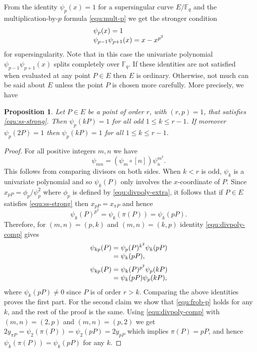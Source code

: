 \documentclass[12pt]{article}
\theoremstyle{plain}
\newtheorem{proposition}[theorem]{Proposition}
\theoremstyle{definition}
\def\F{\ensuremath{\mathbb{F}}}
\begin{document}
From the identity $\psi_p(x) = 1$ for a supersingular curve $E/\F_q$ and the multiplication-by-$p$ 
formula \eqref{equ:mult-p} we get the stronger condition
\begin{equation}
\label{equ:ss-strong}
	\arraycolsep=1.4pt
	\begin{array}{l}
		\psi_p(x) = 1 \\
		\psi_{p - 1}\psi_{p + 1}(x) = x - x^{p^2}
	\end{array}
\end{equation}
for supersingularity. Note that in this case the univariate polynomial $\psi_{p - 1}\psi_{p + 
1}(x)$ splits completely over $\F_q$. If these identities are not satisfied when evaluated at any 
point $P \in E$ then $E$ is ordinary. Otherwise, not much can be said about $E$ unless the point 
$P$ is chosen more carefully. More precisely, we have
\begin{proposition}
	Let $P \in E$ be a point of order $r$, with $(r, p) = 1$, that satisfies \eqref{equ:ss-strong}. 
	Then $\psi_p(kP) = 1$ for all odd $1 \le k \le r - 1$. If moreover $\psi_p(2P) = 1$ then 
	$\psi_p(kP) = 1$ for all $1 \le k \le r - 1$.
\end{proposition}
\begin{proof}
	For all positive integers $m, n$ we have
	\begin{equation}
	\label{equ:divpoly-comp}
		\psi_{mn} = (\psi_m \circ [n])\psi_n^{m^2}.
	\end{equation}
	This follows from comparing divisors on both sides. When $k < r$ is odd, $\psi_k$ is a 
	univariate polynomial and so $\psi_k(P)$ only involves the $x$-coordinate of $P$. Since $x_{pP} 
	= \phi_p / \psi_p^2$ where $\phi_p$ is defined by \eqref{equ:divpoly-extra}, it follows that if 
	$P \in E$ satisfies \eqref{equ:ss-strong} then $x_{pP} = x_{\pi P}$ and hence 
	\begin{equation}
	\label{equ:frob-p}
		\psi_k(P)^{p^2} = \psi_k(\pi(P)) = \psi_k(pP).
	\end{equation}
	Therefore, for $(m, n) = (p, k)$ and $(m, n) = (k, p)$ identity \eqref{equ:divpoly-comp} gives
	\[
	\arraycolsep=1.4pt
	\begin{array}{rll}
		\psi_{kp}(P) & = & \psi_p(P)^{k^2} \psi_k(pP) \\
		& = & \psi_k(pP), \vspace*{2mm} \\		 
		\psi_{kp}(P) & = & \psi_k(P)^{p^2} \psi_p(kP) \\
		& = & \psi_k(pP) \psi_p(kP), \\
	\end{array}
	\]
	where $\psi_k(pP) \ne 0$ since $P$ is of order $r > k$. Comparing the above identities proves 
	the first part. For the second claim we show that \eqref{equ:frob-p} holds for any $k$, and the 
	rest of the proof is the same. Using \eqref{equ:divpoly-comp} with $(m, n) = (2, p)$ and $(m, 
	n) = (p, 2)$ we get $2y_{\pi P} = \psi_2(\pi(P)) = \psi_2(pP) = 2y_{pP}$ which implies $\pi(P) 
	= pP$, and hence $\psi_k(\pi(P)) = \psi_k(pP)$ for any $k$.
\end{proof}
\end{document}
